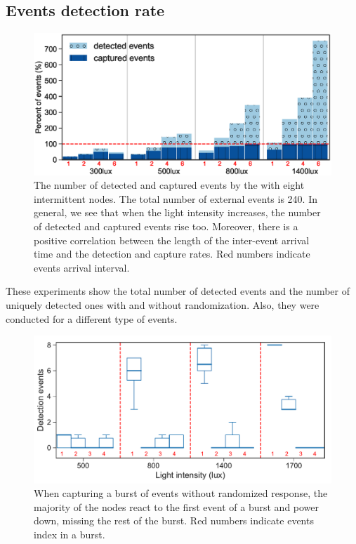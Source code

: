 \subsection{Events detection rate}
%
\begin{figure}[t]
		\centering
	    \includegraphics[width=\columnwidth]{figures/regular_events_capture_rate.eps}
		\caption{The number of detected and captured events by the \fullcim with eight intermittent nodes. The total number of external events is 240. In general, we see that when the light intensity increases, the number of detected and captured events rise too. Moreover, there is a positive correlation between the length of the inter-event arrival time and the detection and capture rates. Red numbers indicate events arrival interval.}
    	\label{fig:events_detection_rate}
\end{figure} 
These experiments show the total number of detected events and the number of uniquely detected ones with and without randomization. Also, they were conducted for a different type of events. 
%
\begin{figure}[t]
    \includegraphics[width=\columnwidth]{figures/events_burst_problem.pdf}
	\caption{When capturing a burst of events without randomized response, the majority of the nodes react to the first event of a burst and power down, missing the rest of the burst. Red numbers indicate events index in a burst.}
    \label{fig:events_burst_problem}
\end{figure}


